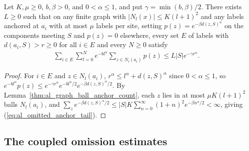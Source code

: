 \begin{lemma}
    \label{thm:al_omitted_anchor_tail}
    \leanok
    Let $K,\mu\ge0$, $b,\beta>0$, and $0<\alpha\le1$, and put
    $\gamma=\min(b,\beta)/2$. There exists $L\ge0$ such that on any finite graph
    with $|N_l(x)|\le K(l+1)^2$ and any labels anchored at $a_i$ with at most
    $\mu$ labels per site, setting $p(z)=e^{-\beta d(z,S)^\alpha}$ on the
    components meeting $S$ and $p(z)=0$ elsewhere, every set $E$ of labels with
    $d(a_i,S)>r\ge0$ for all $i\in E$ and every $N\ge0$ satisfy
    \begin{align}
        \sum_{i\in E}\sum_{l=0}^Ne^{-bl^\alpha}\sum_{z\in N_l(a_i)}p(z)
        \le L|S|e^{-\gamma r^\alpha}.
        \label{eq:al_omitted_anchor_tail}
    \end{align}
\end{lemma}
\begin{proof}\leanok
    For $i\in E$ and $z\in N_l(a_i)$, $r^\alpha\le l^\alpha+d(z,S)^\alpha$ since
    $0<\alpha\le1$, so $e^{-bl^\alpha}p(z)\le e^{-\gamma r^\alpha}e^{-bl^\alpha/2}e^{-\beta d(z,S)^\alpha/2}$.
    By Lemma~\ref{thm:al_graph_ball_anchor_count}, each $z$ lies in at most
    $\mu K(l+1)^2$ balls $N_l(a_i)$, and
    $\sum_z e^{-\beta d(z,S)^\alpha/2}\le|S|K\sum_{n=0}^\infty(1+n)^2e^{-\beta n^\alpha/2}<\infty$,
    giving (\ref{eq:al_omitted_anchor_tail}).
\end{proof}

\subsection{The coupled omission estimates}

